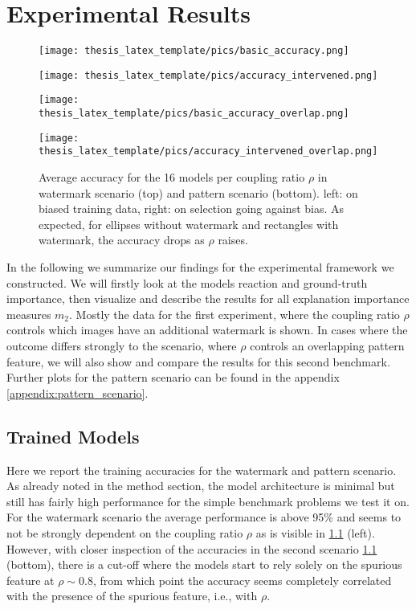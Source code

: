 \chapter{Experimental Results}\label{chapter:results}

\begin{figure}[t!]
    \centering
    \begin{minipage}{0.49\textwidth}
    \texttt{[image: thesis\_latex\_template/pics/basic\_accuracy.png]}
    \end{minipage}
    \begin{minipage}{0.49\textwidth}
    \texttt{[image: thesis\_latex\_template/pics/accuracy\_intervened.png]}
    \end{minipage}
    
    \begin{minipage}{0.49\textwidth}
    \texttt{[image: thesis\_latex\_template/pics/basic\_accuracy\_overlap.png]}
    \end{minipage}
    \begin{minipage}{0.49\textwidth}
    \texttt{[image: thesis\_latex\_template/pics/accuracy\_intervened\_overlap.png]}
    \end{minipage}
    \caption[Accuracies]{Average accuracy for the 16 models per coupling ratio $\rho$ in watermark scenario (top) and pattern scenario (bottom). left: on biased training data, right: on selection going against bias. As expected, for ellipses without watermark and rectangles with watermark, the accuracy drops as $\rho$ raises.}
    \label{fig:accuracy}
\end{figure}
In the following we summarize our findings for the experimental framework we constructed. We will firstly look at the models reaction and ground-truth importance, then visualize and describe the results for all explanation importance measures $m_2$.
Mostly the data for the first experiment, where the coupling ratio $\rho$ controls which images have an additional watermark is shown. In cases where the outcome differs strongly to the scenario, where $\rho$ controls an overlapping pattern feature, we will also show and compare the results for this second benchmark. Further plots for the pattern scenario can be found in the appendix \cref{appendix:pattern_scenario}.

\section{Trained Models}
Here we report the training accuracies for the watermark and pattern scenario. 
As already noted in the method section, the model architecture is minimal but still has fairly high performance for the simple benchmark problems we test it on. 
For the watermark scenario the average performance is above 95\% and seems to not be strongly dependent on the coupling ratio $\rho$ as is visible in \cref{fig:accuracy} (left).
However, with closer inspection of the accuracies in the second scenario   \cref{fig:accuracy} (bottom), there is a cut-off where the models start to rely solely on the spurious feature at $\rho \sim 0.8$, from which point the accuracy seems completely correlated with the presence of the spurious feature, i.e., with $\rho$.

